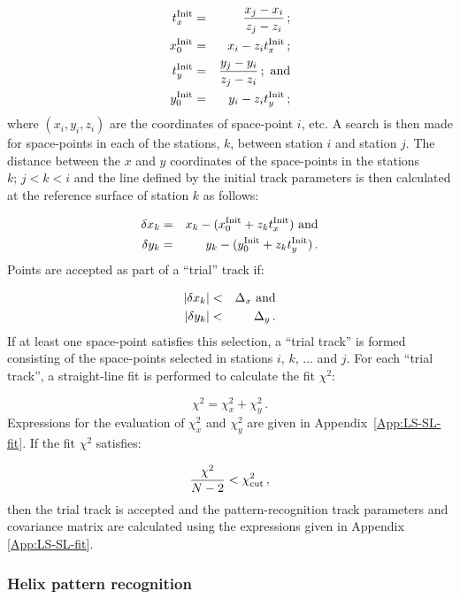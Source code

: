 \begin{eqnarray}
  t_x^{\rm Init} & = & \frac{x_j - x_i}{z_j - z_i} \,;        \\
  x_0^{\rm Init} & = & x_i - z_i t_x^{\rm Init}      \,;        \\
  t_y^{\rm Init} & = & \frac{y_j - y_i}{z_j - z_i} \,; {\rm~and} \\
  y_0^{\rm Init} & = & y_i - z_i t_y^{\rm Init} \,;
\end{eqnarray}
where $(x_i, y_i, z_i)$ are the coordinates of space-point $i$, etc. A search is then made for space-points in each of the stations, $k$, between station $i$ and station $j$. The distance between the $x$ and $y$ coordinates of the space-points in the stations $k;\,j<k<i$ and the line defined by the initial track parameters is then calculated at the reference surface of station $k$ as follows:

\begin{eqnarray}
  \delta x_k & = & x_k - (x_0^{\rm Init} + z_k t_x^{\rm Init}) {\rm~and} \\
  \delta y_k & = & y_k - (y_0^{\rm Init} + z_k t_y^{\rm Init}) \,.
\end{eqnarray}
Points are accepted as part of a ``trial'' track if:

\begin{eqnarray}
  | \delta x_k | & < & \Delta_x {\rm~and} \\
  | \delta y_k | & < & \Delta_y \,.
\end{eqnarray}
If at least one space-point satisfies this selection, a ``trial track'' is formed consisting of the space-points selected in stations $i$, $k$, ... and $j$. For each ``trial track'', a straight-line fit is performed to calculate the fit $\chi^2$:

\begin{equation}
  \chi^2 = \chi_x^2 + \chi_y^2 \,.
\end{equation}
Expressions for the evaluation of $\chi^2_x$ and $\chi^2_y$ are given in Appendix~\ref{App:LS-SL-fit}. If the fit $\chi^2$ satisfies:

\begin{equation}
  \frac{\chi^2}{N-2} < \chi^2_{\rm cut} \,,
\end{equation}
then the trial track is accepted and the pattern-recognition track parameters and covariance matrix are calculated using the expressions given in Appendix \ref{App:LS-SL-fit}.

\subsubsection{Helix pattern recognition}
\label{SubSect:SLPatRec}

